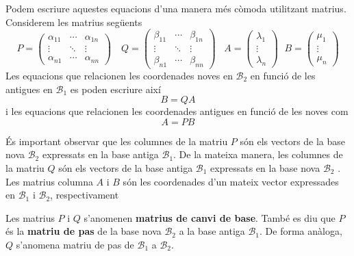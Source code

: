 \begin{observacio}
Podem escriure aquestes equacions d’una manera més còmoda
utilitzant matrius. Considerem les matrius següents 
\begin{equation*}
P=\left( 
\begin{array}{ccc}
\alpha _{11} & \cdots & \alpha _{1n} \\ 
\vdots & \ddots & \vdots \\ 
\alpha _{n1} & \cdots & \alpha _{nn}%
\end{array}%
\right) \,\,\ \ \ Q=\left( 
\begin{array}{ccc}
\beta _{11} & \cdots & \beta _{1n} \\ 
\vdots & \ddots & \vdots \\ 
\beta _{n1} & \cdots & \beta _{nn}%
\end{array}%
\right) \,\ \ \ A=\left( 
\begin{array}{c}
\lambda _{1} \\ 
\vdots \\ 
\lambda _{n}%
\end{array}%
\right) \,\ \ B=\left( 
\begin{array}{c}
\mu _{1} \\ 
\vdots \\ 
\mu _{n}%
\end{array}%
\right)
\end{equation*}%
Les equacions que relacionen les coordenades noves en $\mathcal{B}_{2}$ en
funció de les antigues en $\mathcal{B}_{1}$ es poden escriure així 
\begin{equation*}
B=QA
\end{equation*}%
i les equacions que relacionen les coordenades antigues en funció de
les noves com 
\begin{equation*}
A=PB
\end{equation*}

És important observar que les columnes de la matriu $P$ són els vectors de
la base nova $\mathcal{B}_{2}$ expressats en la base antiga $\mathcal{B}%
_{1}$. De la mateixa manera, les columnes de la matriu $Q$ són els vectors de la
base antiga $\mathcal{B}_{1}$ expressats en la base nova $\mathcal{B}_{2}$%
. Les matrius columna $A$ i $B$ són les coordenades d’un mateix vector
expressades en $\mathcal{B}_{1}$ i $\mathcal{B}_{2}$, respectivament

Les matrius $P$ i $Q$ s’anomenen \textbf{matrius de canvi de base}. També es diu que $P$ és la \textbf{matriu de pas} de la base nova $\mathcal{B}_{2}$ a la base antiga $\mathcal{B}_{1}$. De forma anàloga, $Q$ s’anomena matriu de pas de $\mathcal{B}_{1}$ a $\mathcal{B}_{2}$.
\end{observacio}

